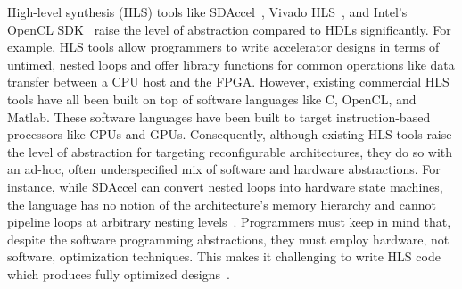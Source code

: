 
High-level synthesis (HLS) tools like SDAccel~\cite{sdaccel}, Vivado HLS~\cite{vivadohls}, and Intel's OpenCL SDK~\cite{opencl_sdk} raise the level of abstraction compared to HDLs significantly. 
For example, HLS tools allow programmers to write accelerator designs in terms of untimed, nested loops and offer library functions for common operations like data transfer between a CPU host and the FPGA.  
However, existing commercial HLS tools have all been built on top of software languages like C, OpenCL, and Matlab. 
These software languages have been built to target instruction-based processors like CPUs and GPUs. 
Consequently, although existing HLS tools raise the level of abstraction for targeting reconfigurable architectures, they do so with an ad-hoc, often underspecified mix of software and hardware abstractions.  
For instance, while SDAccel can convert nested loops into hardware state machines, the language has no notion of the architecture's memory hierarchy and cannot pipeline loops at arbitrary nesting levels~\cite{vivado_userguide}.
Programmers must keep in mind that, despite the software programming abstractions, they must employ hardware, not software, optimization techniques.
This makes it challenging to write HLS code which produces fully optimized designs~\cite{nane2016survey}.



